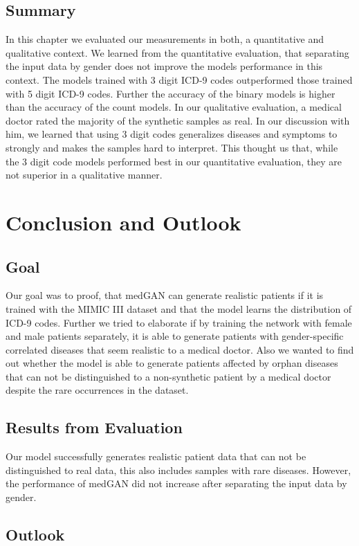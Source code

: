 \documentclass[11pt, a4paper, oneside]{book}
\begin{document}
\section{Summary}
In this chapter we evaluated our measurements in both, a quantitative and qualitative context. We learned from the quantitative evaluation, that separating the input data by gender does not improve the models performance in this context. The models trained with 3 digit ICD-9 codes outperformed those trained with 5 digit ICD-9 codes. Further the accuracy of the binary models is higher than the accuracy of the count models.
In our qualitative evaluation, a medical doctor rated the majority of the synthetic samples as real. In our discussion with him, we learned that using 3 digit codes generalizes diseases and symptoms to strongly and makes the samples hard to interpret.
This thought us that, while the 3 digit code models performed best in our quantitative evaluation, they are not superior in a qualitative manner.

\chapter{Conclusion and Outlook}
\section{Goal}
Our goal was to proof, that medGAN can generate realistic patients if it is trained with the MIMIC III dataset and that the model learns the distribution of ICD-9 codes. Further we tried to elaborate if by training the network with female and male patients separately, it is able to generate patients with gender-specific correlated diseases that seem realistic to a medical doctor. Also we wanted to find out whether the model is able to generate patients affected by orphan diseases that can not be distinguished to a non-synthetic patient by a medical doctor despite the rare occurrences in the dataset.
\section{Results from Evaluation}
Our model successfully generates realistic patient data that can not be distinguished to real data, this also includes samples with rare diseases. However, the performance of medGAN did not increase after separating the input data by gender.
\section{Outlook}
\end{document}
